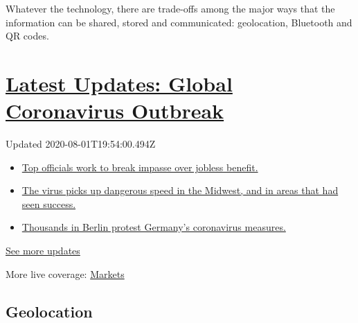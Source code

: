 Whatever the technology, there are trade-offs among the major ways that
the information can be shared, stored and communicated: geolocation,
Bluetooth and QR codes.

\hypertarget{latest-updates-global-coronavirus-outbreak}{%
\section{\texorpdfstring{\href{https://www.nytimes3xbfgragh.onion/2020/08/01/world/coronavirus-covid-19.html?action=click\&pgtype=Article\&state=default\&region=MAIN_CONTENT_1\&context=storylines_live_updates}{Latest
Updates: Global Coronavirus
Outbreak}}{Latest Updates: Global Coronavirus Outbreak}}\label{latest-updates-global-coronavirus-outbreak}}

Updated 2020-08-01T19:54:00.494Z

\begin{itemize}
\tightlist
\item
  \href{https://www.nytimes3xbfgragh.onion/2020/08/01/world/coronavirus-covid-19.html?action=click\&pgtype=Article\&state=default\&region=MAIN_CONTENT_1\&context=storylines_live_updates\#link-3ac56579}{Top
  officials work to break impasse over jobless benefit.}
\item
  \href{https://www.nytimes3xbfgragh.onion/2020/08/01/world/coronavirus-covid-19.html?action=click\&pgtype=Article\&state=default\&region=MAIN_CONTENT_1\&context=storylines_live_updates\#link-8796723}{The
  virus picks up dangerous speed in the Midwest, and in areas that had
  seen success.}
\item
  \href{https://www.nytimes3xbfgragh.onion/2020/08/01/world/coronavirus-covid-19.html?action=click\&pgtype=Article\&state=default\&region=MAIN_CONTENT_1\&context=storylines_live_updates\#link-25930521}{Thousands
  in Berlin protest Germany's coronavirus measures.}
\end{itemize}

\href{https://www.nytimes3xbfgragh.onion/2020/08/01/world/coronavirus-covid-19.html?action=click\&pgtype=Article\&state=default\&region=MAIN_CONTENT_1\&context=storylines_live_updates}{See
more updates}

More live coverage:
\href{https://www.nytimes3xbfgragh.onion/live/2020/07/31/business/stock-market-today-coronavirus?action=click\&pgtype=Article\&state=default\&region=MAIN_CONTENT_1\&context=storylines_live_updates}{Markets}

\hypertarget{geolocation}{%
\subsection{Geolocation}\label{geolocation}}

